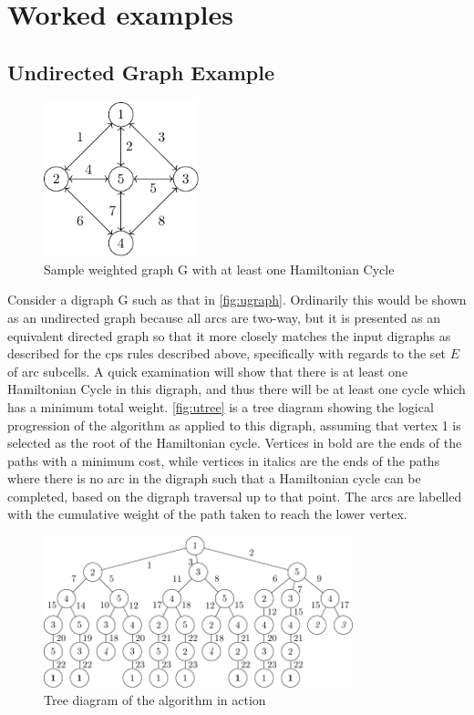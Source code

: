 \section{\label{sect:example}Worked examples}

\subsection{Undirected Graph Example}

\begin{figure}
\centering
\includegraphics[width=0.4\textwidth]{chapters/tsp/figs/ugraph-figure0}
\caption{\label{fig:ugraph}Sample weighted graph G with at least one Hamiltonian Cycle}
\end{figure}

Consider a digraph G such as that in \autoref{fig:ugraph}.  Ordinarily this would be shown as an undirected graph because all arcs are two-way, but it is presented as an equivalent directed graph so that it more closely matches the input digraphs as described for the \gls{cps} rules described above, specifically with regards to the set \(E\) of arc subcells.  A quick examination will show that there is at least one Hamiltonian Cycle in this digraph, and thus there will be at least one cycle which has a minimum total weight.  \autoref{fig:utree} is a tree diagram showing the logical progression of the algorithm as applied to this digraph, assuming that vertex 1 is selected as the root of the Hamiltonian cycle.  Vertices in bold are the ends of the paths with a minimum cost, while vertices in italics are the ends of the paths where there is no arc in the digraph such that a Hamiltonian cycle can be completed, based on the digraph traversal up to that point.  The arcs are labelled with the cumulative weight of the path taken to reach the lower vertex.

\begin{figure}
\centering
\includegraphics[width=0.8\textwidth]{chapters/tsp/figs/ugraph-figure1}
\caption{\label{fig:utree}Tree diagram of the algorithm in action}
\end{figure}

